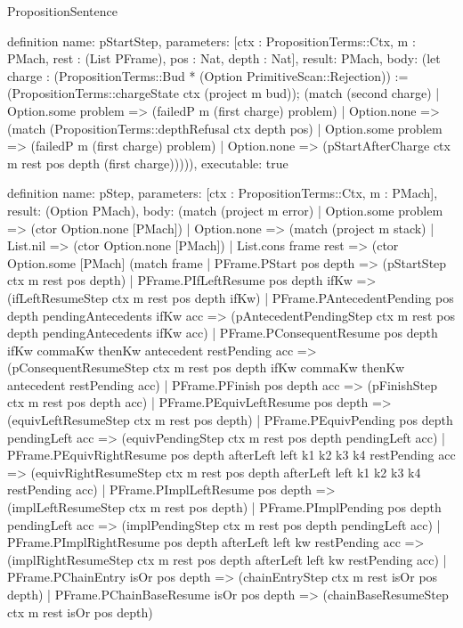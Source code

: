 \begin{lexlean}{PropositionSentence}
\begin{semanticmodule}
definition{
  name: pStartStep,
  parameters: [ctx : PropositionTerms::Ctx, m : PMach, rest : (List PFrame), pos : Nat, depth : Nat],
  result: PMach,
  body: (let charge : (PropositionTerms::Bud * (Option PrimitiveScan::Rejection)) := (PropositionTerms::chargeState ctx (project m bud)); (match (second charge)
    | Option.some problem => (failedP m (first charge) problem)
    | Option.none => (match (PropositionTerms::depthRefusal ctx depth pos)
        | Option.some problem => (failedP m (first charge) problem)
        | Option.none => (pStartAfterCharge ctx m rest pos depth (first charge))))),
  executable: true
}

definition{
  name: pStep,
  parameters: [ctx : PropositionTerms::Ctx, m : PMach],
  result: (Option PMach),
  body: (match (project m error)
    | Option.some problem => (ctor Option.none [PMach])
    | Option.none => (match (project m stack)
        | List.nil => (ctor Option.none [PMach])
        | List.cons frame rest => (ctor Option.some [PMach] (match frame
            | PFrame.PStart pos depth => (pStartStep ctx m rest pos depth)
            | PFrame.PIfLeftResume pos depth ifKw => (ifLeftResumeStep ctx m rest pos depth ifKw)
            | PFrame.PAntecedentPending pos depth pendingAntecedents ifKw acc => (pAntecedentPendingStep ctx m rest pos depth pendingAntecedents ifKw acc)
            | PFrame.PConsequentResume pos depth ifKw commaKw thenKw antecedent restPending acc => (pConsequentResumeStep ctx m rest pos depth ifKw commaKw thenKw antecedent restPending acc)
            | PFrame.PFinish pos depth acc => (pFinishStep ctx m rest pos depth acc)
            | PFrame.PEquivLeftResume pos depth => (equivLeftResumeStep ctx m rest pos depth)
            | PFrame.PEquivPending pos depth pendingLeft acc => (equivPendingStep ctx m rest pos depth pendingLeft acc)
            | PFrame.PEquivRightResume pos depth afterLeft left k1 k2 k3 k4 restPending acc => (equivRightResumeStep ctx m rest pos depth afterLeft left k1 k2 k3 k4 restPending acc)
            | PFrame.PImplLeftResume pos depth => (implLeftResumeStep ctx m rest pos depth)
            | PFrame.PImplPending pos depth pendingLeft acc => (implPendingStep ctx m rest pos depth pendingLeft acc)
            | PFrame.PImplRightResume pos depth afterLeft left kw restPending acc => (implRightResumeStep ctx m rest pos depth afterLeft left kw restPending acc)
            | PFrame.PChainEntry isOr pos depth => (chainEntryStep ctx m rest isOr pos depth)
            | PFrame.PChainBaseResume isOr pos depth => (chainBaseResumeStep ctx m rest isOr pos depth)
}
\end{semanticmodule}
\end{lexlean}
